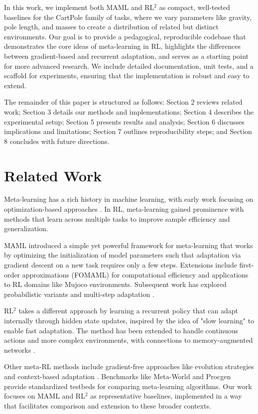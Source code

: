\documentclass[11pt,a4paper]{article}
\begin{document}
In this work, we implement both MAML and RL$^2$ as compact, well-tested baselines for the CartPole family of tasks, where we vary parameters like gravity, pole length, and masses to create a distribution of related but distinct environments. Our goal is to provide a pedagogical, reproducible codebase that demonstrates the core ideas of meta-learning in RL, highlights the differences between gradient-based and recurrent adaptation, and serves as a starting point for more advanced research. We include detailed documentation, unit tests, and a scaffold for experiments, ensuring that the implementation is robust and easy to extend.

The remainder of this paper is structured as follows: Section 2 reviews related work; Section 3 details our methods and implementations; Section 4 describes the experimental setup; Section 5 presents results and analysis; Section 6 discusses implications and limitations; Section 7 outlines reproducibility steps; and Section 8 concludes with future directions.

\section{Related Work}
Meta-learning has a rich history in machine learning, with early work focusing on optimization-based approaches \cite{schmidhuber1987evolutionary, thrun1998learning}. In RL, meta-learning gained prominence with methods that learn across multiple tasks to improve sample efficiency and generalization.

MAML \cite{finn2017model} introduced a simple yet powerful framework for meta-learning that works by optimizing the initialization of model parameters such that adaptation via gradient descent on a new task requires only a few steps. Extensions include first-order approximations (FOMAML) for computational efficiency and applications to RL domains like Mujoco environments. Subsequent work has explored probabilistic variants \cite{grant2018recasting} and multi-step adaptation \cite{antoniou2018train}.

RL$^2$ \cite{duan2016rl2} takes a different approach by learning a recurrent policy that can adapt internally through hidden state updates, inspired by the idea of "slow learning" to enable fast adaptation. The method has been extended to handle continuous actions and more complex environments, with connections to memory-augmented networks \cite{graves2014neural}.

Other meta-RL methods include gradient-free approaches like evolution strategies \cite{salimans2017evolution} and context-based adaptation \cite{rakelly2019efficient}. Benchmarks like Meta-World \cite{yu2020meta} and Procgen \cite{cobbe2019quantifying} provide standardized testbeds for comparing meta-learning algorithms. Our work focuses on MAML and RL$^2$ as representative baselines, implemented in a way that facilitates comparison and extension to these broader contexts.
\end{document}
